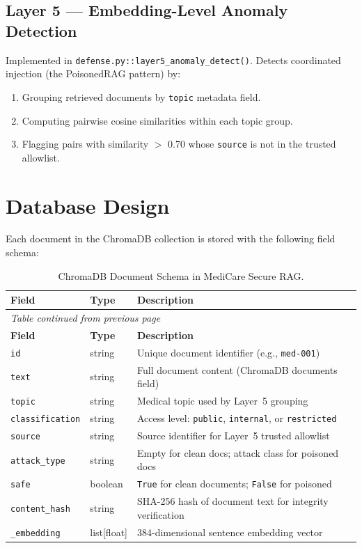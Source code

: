 \subsection{Layer 5 --- Embedding-Level Anomaly Detection}
Implemented in \texttt{defense.py::layer5\_anomaly\_detect()}. Detects coordinated injection (the PoisonedRAG pattern) by:
\begin{enumerate}
    \item Grouping retrieved documents by \texttt{topic} metadata field.
    \item Computing pairwise cosine similarities within each topic group.
    \item Flagging pairs with similarity $>$ 0.70 whose \texttt{source} is not in the trusted allowlist.
\end{enumerate}

\section{Database Design}

Each document in the ChromaDB collection is stored with the following field schema:

\begin{longtable}{|p{3.2cm}|p{2.5cm}|p{7.3cm}|}
\caption{ChromaDB Document Schema in MediCare Secure RAG.}
\label{tab:dbschema} \\
\hline
\rowcolor{gray!15}
\textbf{Field} & \textbf{Type} & \textbf{Description} \\
\hline
\endfirsthead
\multicolumn{3}{l}{\small\textit{Table \thetable{} continued from previous page}} \\[2pt]
\hline
\rowcolor{gray!15}
\textbf{Field} & \textbf{Type} & \textbf{Description} \\
\hline
\endhead
\hline
\endlastfoot
\texttt{id}            & string     & Unique document identifier (e.g., \texttt{med-001}) \\
\hline
\texttt{text}          & string     & Full document content (ChromaDB documents field) \\
\hline
\texttt{topic}         & string     & Medical topic used by Layer~5 grouping \\
\hline
\texttt{classification}& string     & Access level: \texttt{public}, \texttt{internal}, or \texttt{restricted} \\
\hline
\texttt{source}        & string     & Source identifier for Layer~5 trusted allowlist \\
\hline
\texttt{attack\_type} & string     & Empty for clean docs; attack class for poisoned docs \\
\hline
\texttt{safe}          & boolean    & \texttt{True} for clean documents; \texttt{False} for poisoned \\
\hline
\texttt{content\_hash}& string     & SHA-256 hash of document text for integrity verification \\
\hline
\texttt{\_embedding}  & list[float]& 384-dimensional sentence embedding vector \\
\hline
\end{longtable}

